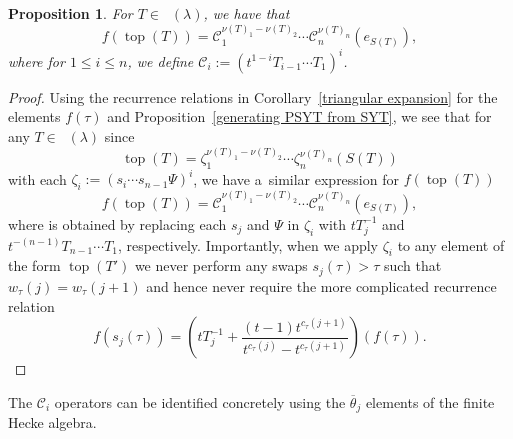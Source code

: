 \documentclass[10pt,a4paper]{amsart}
\numberwithin{equation}{section}
\newtheorem{Proposition}[Theorem]{Proposition}
\theoremstyle{definition}
\DeclareMathOperator{\RYT}{\mathrm{RYT}_{\geq 0}}
\DeclareMathOperator{\RSSYT}{\mathrm{RSSYT}_{\geq 0}}
\DeclareMathOperator{\Top}{\mathrm{top}}
\begin{document}
\begin{Proposition}\label{creation operators action}
 For $T \in \RYT(\lambda)$, we have that
 \[
 f(\Top(T)) = \mathscr{C}_1^{\nu(T)_1 - \nu(T)_2}\cdots \mathscr{C}_n^{\nu(T)_n}(e_{S(T)}),
 \]
 where for $1 \leq i \leq n$, we define
 $\mathscr{C}_i:= \left( t^{1-i} T_{i-1}\cdots T_1 \right)^{i}$.
\end{Proposition}

\begin{proof}
 Using the recurrence relations in Corollary~\ref{triangular expansion} for the elements $f(\tau)$ and Proposition~\ref{generating PSYT from SYT}, we see that for any $T\in \RSSYT(\lambda)$ since
 \[
 \Top(T) = \zeta_1^{\nu(T)_1 - \nu(T)_2}\cdots \zeta_n^{\nu(T)_n}(S(T))
 \]
 with each $\zeta_i:= (s_i\cdots s_{n-1}\Psi)^{i}$, we have a~similar expression for $f(\Top(T))$
 \[
 f(\Top(T))= \mathscr{C}_1^{\nu(T)_1 - \nu(T)_2}\cdots \mathscr{C}_n^{\nu(T)_n}(e_{S(T)}),
 \]
 where  is obtained by replacing each $s_j$ and $\Psi$ in $\zeta_i$ with $tT_j^{-1}$ and $t^{-(n-1)}T_{n-1}\cdots T_1$, respectively. Importantly, when we apply $\zeta_i$ to any element of the form $\Top(T')$ we never perform any swaps $s_j(\tau) > \tau$ such that~${w_{\tau}(j) = w_{\tau}(j+1)}$ and hence never require the more complicated recurrence relation
 \[
 f(s_j(\tau)) = \left( tT_j^{-1} + \frac{(t-1)t^{c_{\tau}(j+1)}}{t^{c_{\tau}(j)} - t^{c_{\tau}(j+1)}} \right)(f(\tau)).\tag*{\qed}
 \] \renewcommand{\qed}{}
\end{proof}

The $\mathscr{C}_i$ operators can be identified concretely using the $\overline{\theta}_j$ elements of the finite Hecke algebra.
\end{document}

